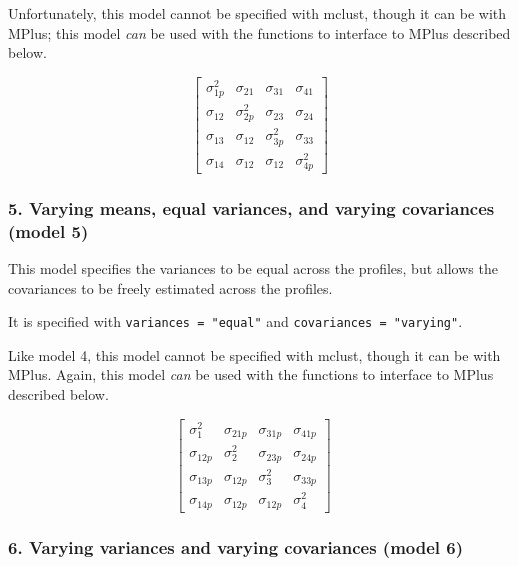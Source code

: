\documentclass[
  english,
  man]{apa6}
\begin{document}
Unfortunately, this model cannot be specified with mclust, though it can be with MPlus; this model \emph{can} be used with the functions to interface to MPlus described below.

\[
\left[ \begin{matrix} { \sigma  }_{ 1p }^{ 2 } & { \sigma  }_{ 21 } & { \sigma  }_{ 31 } & { \sigma  }_{ 41 } \\ { \sigma  }_{ 12 } & { \sigma  }_{ 2p }^{ 2 } & { \sigma  }_{ 23 } & { \sigma  }_{ 24 } \\ { \sigma  }_{ 13 } & { \sigma  }_{ 12 } & { \sigma  }_{ 3p }^{ 2 } & { \sigma  }_{ 33 } \\ { \sigma  }_{ 14 } & { \sigma  }_{ 12 } & { \sigma  }_{ 12 } & { \sigma  }_{ 4p }^{ 2 } \end{matrix} \right] 
\]

\hypertarget{varying-means-equal-variances-and-varying-covariances-model-5}{%
\subsubsection{5. Varying means, equal variances, and varying covariances (model 5)}\label{varying-means-equal-variances-and-varying-covariances-model-5}}

This model specifies the variances to be equal across the profiles, but allows the covariances to be freely estimated across the profiles.

It is specified with \texttt{variances\ =\ "equal"} and \texttt{covariances\ =\ "varying"}.

Like model 4, this model cannot be specified with mclust, though it can be with MPlus. Again, this model \emph{can} be used with the functions to interface to MPlus described below.

\[
\left[ \begin{matrix} { \sigma  }_{ 1 }^{ 2 } & { \sigma  }_{ 21p } & { \sigma  }_{ 31p } & { \sigma  }_{ 41p } \\ { \sigma  }_{ 12p } & { \sigma  }_{ 2 }^{ 2 } & { \sigma  }_{ 23p } & { \sigma  }_{ 24p } \\ { \sigma  }_{ 13p } & { \sigma  }_{ 12p } & { \sigma  }_{ 3 }^{ 2 } & { \sigma  }_{ 33p } \\ { \sigma  }_{ 14p } & { \sigma  }_{ 12p } & { \sigma  }_{ 12p } & { \sigma  }_{ 4 }^{ 2 } \end{matrix} \right] \quad 
\]

\hypertarget{varying-variances-and-varying-covariances-model-6}{%
\subsubsection{6. Varying variances and varying covariances (model 6)}\label{varying-variances-and-varying-covariances-model-6}}
\end{document}
